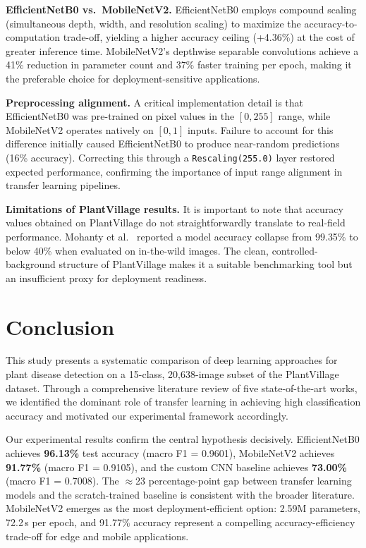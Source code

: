 \documentclass[10pt,twocolumn]{article}
\begin{document}
\textbf{EfficientNetB0 vs.\ MobileNetV2.} EfficientNetB0 employs compound scaling (simultaneous depth, width, and resolution scaling) to maximize the accuracy-to-computation trade-off, yielding a higher accuracy ceiling (+4.36\%) at the cost of greater inference time. MobileNetV2's depthwise separable convolutions achieve a 41\% reduction in parameter count and 37\% faster training per epoch, making it the preferable choice for deployment-sensitive applications.

\textbf{Preprocessing alignment.} A critical implementation detail is that EfficientNetB0 was pre-trained on pixel values in the $[0, 255]$ range, while MobileNetV2 operates natively on $[0, 1]$ inputs. Failure to account for this difference initially caused EfficientNetB0 to produce near-random predictions (16\% accuracy). Correcting this through a \texttt{Rescaling(255.0)} layer restored expected performance, confirming the importance of input range alignment in transfer learning pipelines.

\textbf{Limitations of PlantVillage results.} It is important to note that accuracy values obtained on PlantVillage do not straightforwardly translate to real-field performance. Mohanty et al.\ \cite{Mohanty2016} reported a model accuracy collapse from 99.35\% to below 40\% when evaluated on in-the-wild images. The clean, controlled-background structure of PlantVillage makes it a suitable benchmarking tool but an insufficient proxy for deployment readiness.

\section{Conclusion}

This study presents a systematic comparison of deep learning approaches for plant disease detection on a 15-class, 20,638-image subset of the PlantVillage dataset. Through a comprehensive literature review of five state-of-the-art works, we identified the dominant role of transfer learning in achieving high classification accuracy and motivated our experimental framework accordingly.

Our experimental results confirm the central hypothesis decisively. EfficientNetB0 achieves \textbf{96.13\%} test accuracy (macro F1 = 0.9601), MobileNetV2 achieves \textbf{91.77\%} (macro F1 = 0.9105), and the custom CNN baseline achieves \textbf{73.00\%} (macro F1 = 0.7008). The $\approx$23 percentage-point gap between transfer learning models and the scratch-trained baseline is consistent with the broader literature. MobileNetV2 emerges as the most deployment-efficient option: 2.59M parameters, 72.2\,s per epoch, and 91.77\% accuracy represent a compelling accuracy-efficiency trade-off for edge and mobile applications.
\end{document}
